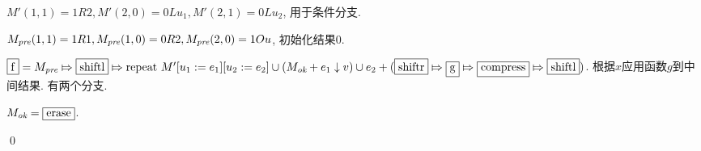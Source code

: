 \newcommand{\G}{\boxed{\mathrm{g}}}
\newcommand{\predB}{\boxed{\mathrm{pred}}}

\begin{pf} \rm \;
      
    $M'(1, 1) = 1R2, M'(2, 0) = 0Lu_1, M'(2, 1) = 0Lu_2$, 用于条件分支.

    $M_\textit{pre}(1, 1) = 1R1, M_\textit{pre}(1, 0) = 0R2, M_\textit{pre}(2, 0) = 1Ou$, 初始化结果$0$.

    $\F = \Mpre \Mapsto \shiftlB \Mapsto \mathrm{repeat}\ M'[u_1:=e_1][u_2:=e_2] \cup (\Mok + e_1\downarrow v) \cup e_2 + (\shiftrB \Mapsto \G \Mapsto \compressB \Mapsto \shiftlB) $. 根据$x$应用函数$g$到中间结果. 有两个分支.

    $M_\textit{ok} = \boxed{\textrm{erase}}$.

    \qed
\end{pf}